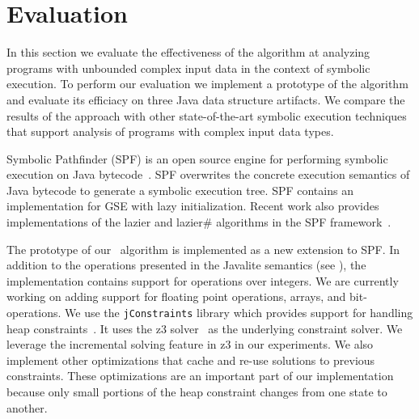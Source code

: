 

\section{Evaluation}
\label{sec:eval}
In this section we evaluate the effectiveness of the \symtxt{}
algorithm at analyzing programs with unbounded complex input data in
the context of symbolic execution. To perform our evaluation
we implement a prototype of the algorithm and evaluate its efficiacy on
three Java data structure artifacts. We compare the results of the
\symtxt{} approach with other state-of-the-art symbolic execution techniques 
that support analysis of programs with complex input data types. 

Symbolic Pathfinder (SPF) is an open source engine for performing symbolic 
execution on Java 
bytecode~\cite{visser:ase03,Pasareanu:ISSTA08,pasareanu:ase10,DBLP:journals/ase/PasareanuVBGMR13}.
SPF overwrites the concrete execution semantics of Java
bytecode to generate a symbolic execution tree. SPF contains an
implementation for GSE with lazy initialization. Recent work also
provides implementations of the lazier and lazier\# algorithms in the
SPF framework~\cite{Hillery:2014}.


The prototype of our~\symtxt{} algorithm is implemented as a new
extension to SPF.  In addition to the operations presented in the
Javalite semantics (see ), the implementation
contains support for operations over integers.
We are currently working on adding support for floating point
operations, arrays, and bit-operations.  We use the
\texttt{jConstraints} library which provides support for handling heap
constraints~\cite{ase2014-ghilrr,jpf2014-dghirr}. It uses the z3
solver~\cite{deMouraBjorner08Z3} as the underlying constraint
solver. We leverage the incremental solving feature in z3 in our
experiments. We also implement other optimizations that cache and
re-use solutions to previous constraints. These optimizations are an
important part of our implementation because only small portions of
the heap constraint changes from one state to another.



